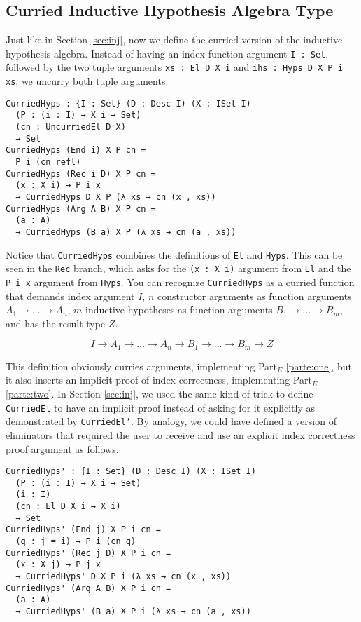 \documentclass[preprint,nonatbib]{sigplanconf}
\newcommand{\refsec}[1]{Section \ref{sec:#1}}
\newcommand{\refparte}[1]{Part$_E$ \ref{parte:#1}}
\begin{document}
\subsection{Curried Inductive Hypothesis Algebra Type}

Just like in \refsec{inj}, now we define the curried version of
the inductive hypothesis algebra. Instead of having an index function
argument {\tt I : Set}, followed by the two tuple arguments
{\tt xs : El D X i} and {\tt ihs : Hyps D X P i xs}, we uncurry
both tuple arguments.

\begin{verbatim}
CurriedHyps : {I : Set} (D : Desc I) (X : ISet I)
  (P : (i : I) → X i → Set)
  (cn : UncurriedEl D X)
  → Set
CurriedHyps (End i) X P cn =
  P i (cn refl)
CurriedHyps (Rec i D) X P cn =
  (x : X i) → P i x
  → CurriedHyps D X P (λ xs → cn (x , xs))
CurriedHyps (Arg A B) X P cn =
  (a : A)
  → CurriedHyps (B a) X P (λ xs → cn (a , xs))
\end{verbatim}

Notice that {\tt CurriedHyps} combines the
definitions of {\tt El} and {\tt Hyps}. This can be seen in the
{\tt Rec} branch, which asks for the {\tt (x : X i)} argument
from {\tt El} and the {\tt P i x} argument from {\tt Hyps}. You can
recognize {\tt CurriedHyps} as a curried function that demands
index argument $I$, $n$ constructor arguments as function arguments
$A_1 → ... → A_n$, $m$ inductive hypotheses as function arguments
$B_1 → ... → B_m$, and has the result type $Z$.

\[
I → A_1 → ... → A_n → B_1 → ... → B_m → Z
\]

This definition obviously curries arguments, implementing
\refparte{one}, but it also inserts an implicit proof of index
correctness, implementing \refparte{two}. In \refsec{inj}, we used
the same kind of trick to define {\tt CurriedEl} to have an implicit
proof instead of asking for it explicitly as demonstrated
by {\tt CurriedEl'}. By analogy, we could have defined a version of
eliminators that required the user to receive and use an explicit
index correctness proof argument as follows.

\begin{verbatim}
CurriedHyps' : {I : Set} (D : Desc I) (X : ISet I)
  (P : (i : I) → X i → Set)
  (i : I)
  (cn : El D X i → X i)
  → Set
CurriedHyps' (End j) X P i cn =
  (q : j ≡ i) → P i (cn q)
CurriedHyps' (Rec j D) X P i cn =
  (x : X j) → P j x
  → CurriedHyps' D X P i (λ xs → cn (x , xs))
CurriedHyps' (Arg A B) X P i cn =
  (a : A)
  → CurriedHyps' (B a) X P i (λ xs → cn (a , xs))
\end{verbatim}
\end{document}
